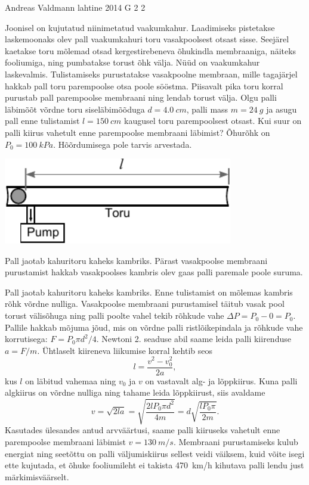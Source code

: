 {Andreas Valdmann} %
{lahtine} %
{2014} %
{G 2} %
{2} %
{
\ifStatement
Joonisel on kujutatud niinimetatud vaakumkahur. Laadimiseks pistetakse laskemoonaks olev pall vaakumkahuri toru vasakpoolsest otsast sisse. Seejärel kaetakse toru mõlemad otsad kergestirebeneva õhukindla membraaniga, näiteks fooliumiga, ning pumbatakse torust õhk välja. Nüüd on vaakumkahur laskevalmis. Tulistamiseks purustatakse vasakpoolne membraan, mille tagajärjel hakkab pall toru parempoolse otsa poole sööstma. Piisavalt pika toru korral purustab pall parempoolse membraani ning lendab torust välja. Olgu palli läbimõõt võrdne toru siseläbimõõduga $d=\SI{4,0}{cm}$, palli mass $m=\SI{24}{g}$ ja asugu pall enne tulistamist $l=\SI{150}{cm}$ kaugusel toru parempoolsest otsast. Kui suur on palli kiirus vahetult enne parempoolse membraani läbimist? Õhurõhk on $P_0=\SI{100}{kPa}$. Hõõrdumisega pole tarvis arvestada.
\begin{center}
 \includegraphics[width=0.75\textwidth]{2014-lahg-02-vaakumkahur.pdf}
\end{center}
\fi


\ifHint
Pall jaotab kahuritoru kaheks kambriks. Pärast vasakpoolse membraani purustamist hakkab vasakpoolses kambris olev gaas palli paremale poole suruma.
\fi


\ifSolution
Pall jaotab kahuritoru kaheks kambriks. Enne tulistamist on mõlemas kambris rõhk võrdne nulliga. Vasakpoolse membraani purustamisel täitub vasak pool torust välisõhuga ning palli poolte vahel tekib rõhkude vahe $\Delta P=P_0-0=P_0$. Pallile hakkab mõjuma jõud, mis on võrdne palli ristlõikepindala ja rõhkude vahe korrutisega: $F=P_0\pi d^2/4$. Newtoni 2. seaduse abil saame leida palli kiirenduse $a=F/m$. Ühtlaselt kiireneva liikumise korral kehtib seos
\[ l=\frac{v^2-v_0^2}{2a}, \]
kus $l$ on läbitud vahemaa ning $v_0$ ja $v$ on vastavalt alg- ja lõppkiirus. Kuna palli algkiirus on võrdne nulliga ning tahame leida lõppkiirust, siis avaldame
\[ v=\sqrt{2la}=\sqrt{\frac{2lP_0\pi d^2}{4m}}=d\sqrt{\frac{lP_0\pi}{2m}}.\]
Kasutades ülesandes antud arvväärtusi, saame palli kiiruseks vahetult enne parempoolse membraani läbimist $v=\SI{130}{m/s}$. Membraani purustamiseks kulub energiat ning seetõttu on palli väljumiskiirus sellest veidi väiksem, kuid võite isegi ette kujutada, et õhuke fooliumileht ei takista \SI{470}{km/h} kihutava palli lendu just märkimisväärselt.
\fi


}
